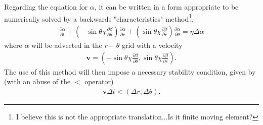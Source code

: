 \documentclass[letterpaper,10pt]{article}
\newcommand{\pp}{\partial}
\renewcommand{\vec}[1]{\boldsymbol#1}
\begin{document}
Regarding the equation for $\alpha$, it can be written in a form appropriate to be numerically solved by a backwards "characteristics" method\footnote{I believe this is not the appropriate translation...Is it finite moving element?},
\begin{eqnarray}
\frac{\pp\alpha}{\pp t}+\left(-\sin\theta\chi\frac{\pp\beta}{\pp\theta}\right)\frac{\pp \alpha}{\pp r}+\left(\sin\theta\chi\frac{\pp\beta}{\pp r}\right)\frac{\pp \alpha}{\pp \theta}=\eta\Delta\alpha
\end{eqnarray}
where $\alpha$ will be advected in the $r-\theta$ grid with a  velocity
\begin{eqnarray}
\vec{v}=\left(-\sin\theta\chi\frac{\pp\beta}{\pp \theta},\sin\theta\chi\frac{\pp\beta}{\pp r}\right).
\end{eqnarray}
The use of this method will then impose a necessary stability condition, given by (with an abuse of the $<$ operator)
\begin{eqnarray}
\vec{v}\Delta t<(\Delta r,\Delta\theta).
\end{eqnarray}
\end{document}
